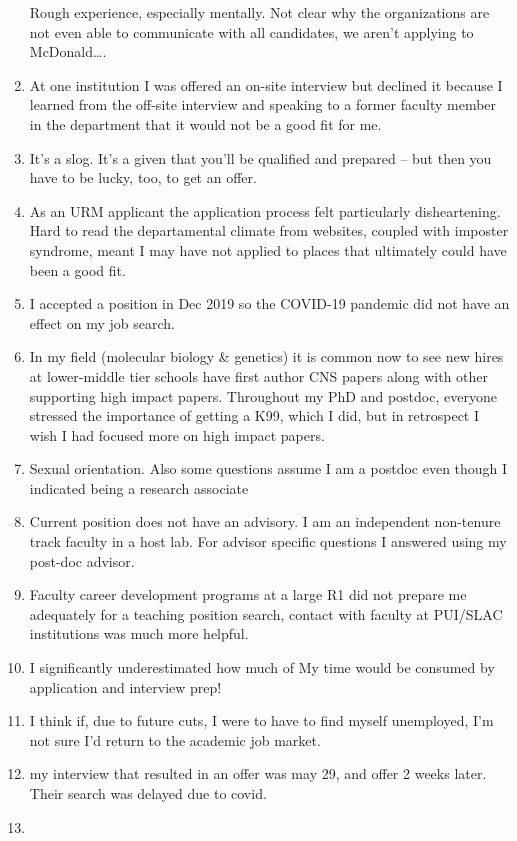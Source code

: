 \documentclass[]{article}
\begin{document}
\begin{enumerate}
  Rough experience, especially mentally. Not clear why the organizations
  are not even able to communicate with all candidates, we aren't
  applying to McDonald\ldots{}.
\item
  At one institution I was offered an on-site interview but declined it
  because I learned from the off-site interview and speaking to a former
  faculty member in the department that it would not be a good fit for
  me.
\item
  It's a slog. It's a given that you'll be qualified and prepared -- but
  then you have to be lucky, too, to get an offer.
\item
  As an URM applicant the application process felt particularly
  disheartening. Hard to read the departamental climate from websites,
  coupled with imposter syndrome, meant I may have not applied to places
  that ultimately could have been a good fit.
\item
  I accepted a position in Dec 2019 so the COVID-19 pandemic did not
  have an effect on my job search.
\item
  In my field (molecular biology \& genetics) it is common now to see
  new hires at lower-middle tier schools have first author CNS papers
  along with other supporting high impact papers. Throughout my PhD and
  postdoc, everyone stressed the importance of getting a K99, which I
  did, but in retrospect I wish I had focused more on high impact
  papers.
\item
  Sexual orientation. Also some questions assume I am a postdoc even
  though I indicated being a research associate
\item
  Current position does not have an advisory. I am an independent
  non-tenure track faculty in a host lab. For advisor specific questions
  I answered using my post-doc advisor.
\item
  Faculty career development programs at a large R1 did not prepare me
  adequately for a teaching position search, contact with faculty at
  PUI/SLAC institutions was much more helpful.
\item
  I significantly underestimated how much of My time would be consumed
  by application and interview prep!
\item
  I think if, due to future cuts, I were to have to find myself
  unemployed, I'm not sure I'd return to the academic job market.
\item
  my interview that resulted in an offer was may 29, and offer 2 weeks
  later. Their search was delayed due to covid.
\item

\end{enumerate}
\end{document}
